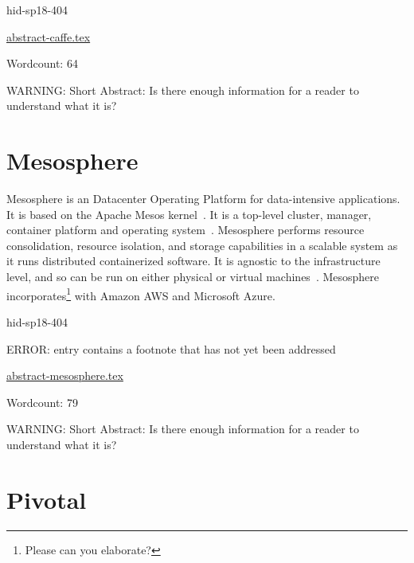 \begin{IU}

hid-sp18-404

\href{https://github.com/cloudmesh-community/hid-sp18-404/blob/master//technology/abstract-caffe.tex}{abstract-caffe.tex}

 

Wordcount: 64

WARNING: Short Abstract: Is there enough information for a reader to understand what it is?

\end{IU}

\section{Mesosphere}

Mesosphere is an Datacenter Operating Platform for 
data-intensive applications. It is based on the Apache Mesos 
kernel~\cite{hid-sp18-404-Concepts2018}. It is a top-level 
cluster, manager, container platform and operating system~\cite{hid-sp18-404-Features2018}. 
Mesosphere performs resource consolidation, resource isolation, 
and storage capabilities in a scalable system as it runs distributed 
containerized software. It is agnostic to the infrastructure level, 
and so can be run on either physical or virtual machines~\cite{hid-sp18-404-Architecture2018}. 
Mesosphere incorporates\footnote{Please can you elaborate?} with Amazon AWS and Microsoft Azure.


\begin{IU}

hid-sp18-404

ERROR: entry contains a footnote that has not yet been addressed

\href{https://github.com/cloudmesh-community/hid-sp18-404/blob/master//technology/abstract-mesosphere.tex}{abstract-mesosphere.tex}

 

Wordcount: 79

WARNING: Short Abstract: Is there enough information for a reader to understand what it is?

\end{IU}

\section{Pivotal}

